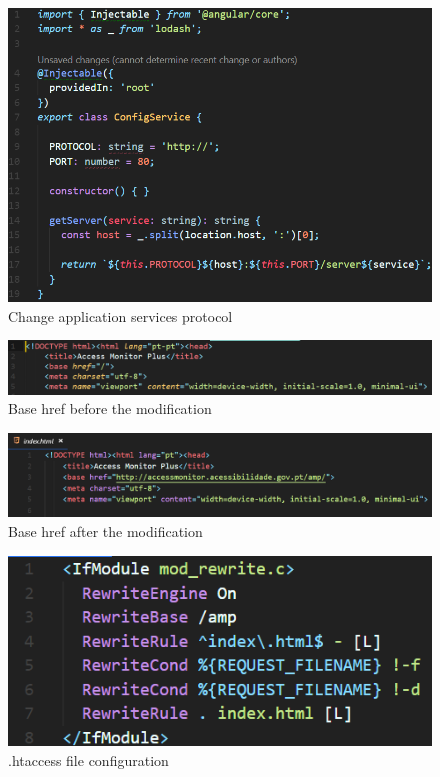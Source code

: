 \begin{figure}[ht]
    \centering
    \includegraphics[width=\linewidth]{lib/images/deploy/applications/protocol_https.png}
    \caption{Change application services protocol}
    \label{fig:protocol_https}
\end{figure}

\begin{figure}[ht]
    \centering
    \includegraphics[width=\linewidth]{lib/images/deploy/applications/anexo_instalacao_amp_base_href_before.png}
    \caption{Base href before the modification}
    \label{fig:base_href_before}
\end{figure}

\begin{figure}[ht]
    \centering
    \includegraphics[width=\linewidth]{lib/images/deploy/applications/base_href.png}
    \caption{Base href after the modification}
    \label{fig:base_href_after}
\end{figure}

\begin{figure}
    \centering
    \includegraphics{lib/images/deploy/applications/htaccess.png}
    \caption{.htaccess file configuration}
    \label{fig:htaccess}
\end{figure}
